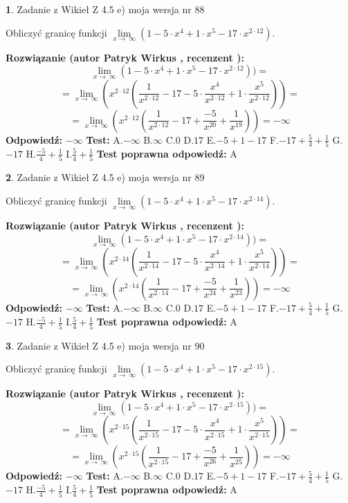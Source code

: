 \documentclass[12pt, a4paper]{article}
\theoremstyle{definition} %
\newtheorem{zad}{}
\newcommand{\zadStart}[1]{\begin{zad}#1\newline}
\newcommand{\zadStop}{\end{zad}}
\newcommand{\rozwStart}[2]{\noindent \textbf{Rozwiązanie (autor #1 , recenzent #2): }\newline}
\newcommand{\rozwStop}{\newline}
\newcommand{\odpStart}{\noindent \textbf{Odpowiedź:}\newline}
\newcommand{\odpStop}{\newline}
\newcommand{\testStart}{\noindent \textbf{Test:}\newline}
\newcommand{\testStop}{\newline}
\newcommand{\kluczStart}{\noindent \textbf{Test poprawna odpowiedź:}\newline}
\newcommand{\kluczStop}{\newline}
\begin{document}
\zadStart{Zadanie z Wikieł Z 4.5 e) moja wersja nr 88}



Obliczyć granicę funkcji  $\lim\limits_{x\to\ \infty}(1 - 5 \cdot x^{4}+1 \cdot x^{5}- 17 \cdot x^{2\cdot12})$.
\zadStop
\rozwStart{Patryk Wirkus}{}
$$\lim\limits_{x\to\ \infty}(1 - 5 \cdot x^{4}+1 \cdot x^{5}- 17 \cdot x^{2\cdot12}))=$$
$$=\lim\limits_{x\to\ \infty}(x^{2\cdot12}(\frac{1}{x^{2\cdot12}}-17 -5 \cdot \frac{x^{4}}{x^{2\cdot12}}+1 \cdot \frac{x^{5}}{x^{2\cdot12}}))=$$
$$=\lim\limits_{x\to\ \infty}(x^{2\cdot12}(\frac{1}{x^{2\cdot12}}-17 + \frac{-5}{x^{20}}+ \frac{1}{x^{19}}))=-\infty$$
\rozwStop
\odpStart
$-\infty$
\odpStop
\testStart
A.$-\infty$ B.$\infty$ C.$0$ D.$17$ E.$-5 + 1 - 17$
F.$-17+\frac{5}{4}+\frac{1}{5}$ G.$-17$
H.$\frac{-5}{4}+\frac{1}{5}$
I.$\frac{5}{4}+\frac{1}{5}$
\testStop
\kluczStart
A
\kluczStop



\zadStart{Zadanie z Wikieł Z 4.5 e) moja wersja nr 89}



Obliczyć granicę funkcji  $\lim\limits_{x\to\ \infty}(1 - 5 \cdot x^{4}+1 \cdot x^{5}- 17 \cdot x^{2\cdot14})$.
\zadStop
\rozwStart{Patryk Wirkus}{}
$$\lim\limits_{x\to\ \infty}(1 - 5 \cdot x^{4}+1 \cdot x^{5}- 17 \cdot x^{2\cdot14}))=$$
$$=\lim\limits_{x\to\ \infty}(x^{2\cdot14}(\frac{1}{x^{2\cdot14}}-17 -5 \cdot \frac{x^{4}}{x^{2\cdot14}}+1 \cdot \frac{x^{5}}{x^{2\cdot14}}))=$$
$$=\lim\limits_{x\to\ \infty}(x^{2\cdot14}(\frac{1}{x^{2\cdot14}}-17 + \frac{-5}{x^{24}}+ \frac{1}{x^{23}}))=-\infty$$
\rozwStop
\odpStart
$-\infty$
\odpStop
\testStart
A.$-\infty$ B.$\infty$ C.$0$ D.$17$ E.$-5 + 1 - 17$
F.$-17+\frac{5}{4}+\frac{1}{5}$ G.$-17$
H.$\frac{-5}{4}+\frac{1}{5}$
I.$\frac{5}{4}+\frac{1}{5}$
\testStop
\kluczStart
A
\kluczStop



\zadStart{Zadanie z Wikieł Z 4.5 e) moja wersja nr 90}



Obliczyć granicę funkcji  $\lim\limits_{x\to\ \infty}(1 - 5 \cdot x^{4}+1 \cdot x^{5}- 17 \cdot x^{2\cdot15})$.
\zadStop
\rozwStart{Patryk Wirkus}{}
$$\lim\limits_{x\to\ \infty}(1 - 5 \cdot x^{4}+1 \cdot x^{5}- 17 \cdot x^{2\cdot15}))=$$
$$=\lim\limits_{x\to\ \infty}(x^{2\cdot15}(\frac{1}{x^{2\cdot15}}-17 -5 \cdot \frac{x^{4}}{x^{2\cdot15}}+1 \cdot \frac{x^{5}}{x^{2\cdot15}}))=$$
$$=\lim\limits_{x\to\ \infty}(x^{2\cdot15}(\frac{1}{x^{2\cdot15}}-17 + \frac{-5}{x^{26}}+ \frac{1}{x^{25}}))=-\infty$$
\rozwStop
\odpStart
$-\infty$
\odpStop
\testStart
A.$-\infty$ B.$\infty$ C.$0$ D.$17$ E.$-5 + 1 - 17$
F.$-17+\frac{5}{4}+\frac{1}{5}$ G.$-17$
H.$\frac{-5}{4}+\frac{1}{5}$
I.$\frac{5}{4}+\frac{1}{5}$
\testStop
\kluczStart
A
\kluczStop
\end{document}
